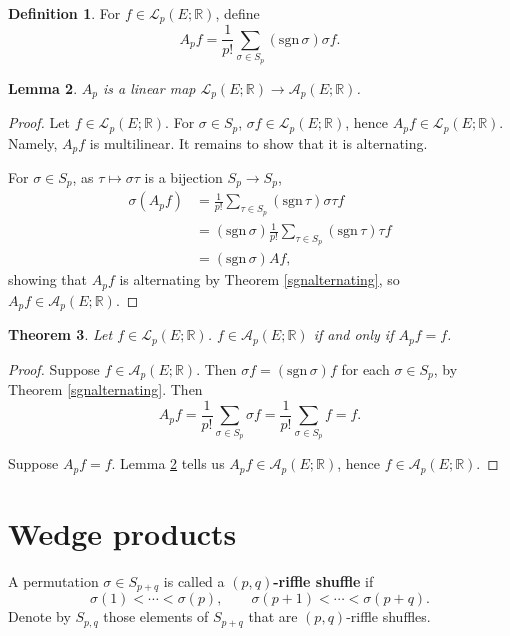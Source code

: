 \documentclass{amsart}
\newcommand{\sgn}{\mathrm{sgn}\,}
\newtheorem{theorem}{Theorem}
\newtheorem{lemma}[theorem]{Lemma}
\theoremstyle{definition}
\newtheorem{definition}[theorem]{Definition}
\begin{document}
\begin{definition}
For $f \in \mathscr{L}_p(E;\mathbb{R})$, define
\[
A_p f = \frac{1}{p!} \sum_{\sigma \in S_p} (\sgn \sigma) \sigma f.
\]
\end{definition}

\begin{lemma}
$A_p$ is a linear map $\mathscr{L}_p(E;\mathbb{R}) \to \mathscr{A}_p(E;\mathbb{R})$.
\label{Aplemma}
\end{lemma}
\begin{proof}
Let $f \in \mathscr{L}_p(E;\mathbb{R})$.  For $\sigma \in S_p$, $\sigma f \in \mathscr{L}_p(E;\mathbb{R})$, hence
$A_p f \in \mathscr{L}_p(E;\mathbb{R})$. Namely, $A_pf$ is multilinear. It remains to show that it is alternating.


For $\sigma \in S_p$, as $\tau \mapsto \sigma \tau$ is a bijection $S_p \to S_p$,
\begin{align*}
\sigma (A_pf) &=  \frac{1}{p!}\sum_{\tau \in S_p} (\sgn \tau) \sigma \tau f\\
&=(\sgn \sigma)  \frac{1}{p!} \sum_{\tau \in S_p} (\sgn \tau) \tau f\\
&=(\sgn \sigma) Af,
\end{align*}
showing that $A_pf$ is alternating by Theorem \ref{sgnalternating}, so $A_pf \in \mathscr{A}_p(E;\mathbb{R})$. 
\end{proof}


\begin{theorem}
Let $f \in \mathscr{L}_p(E;\mathbb{R})$. $f \in \mathscr{A}_p(E;\mathbb{R})$ if and only if $A_pf=f$.
\label{Aproj}
\end{theorem}
\begin{proof}
Suppose $f \in  \mathscr{A}_p(E;\mathbb{R})$. Then $\sigma f  = (\sgn \sigma) f$ for each $\sigma \in S_p$, by Theorem \ref{sgnalternating}.
Then
\[
A_p f = \frac{1}{p!} \sum_{\sigma \in S_p} \sigma f = \frac{1}{p!} \sum_{\sigma \in S_p} f = f.
\]

Suppose $A_pf =f$. Lemma \ref{Aplemma} tells us $A_pf \in \mathscr{A}_p(E;\mathbb{R})$, hence $f \in \mathscr{A}_p(E;\mathbb{R})$.
\end{proof}



\section{Wedge products}
A permutation $\sigma \in S_{p+q}$ is called a \textbf{$(p,q)$-riffle shuffle} if 
\[
\sigma(1)<\cdots<\sigma(p),\qquad \sigma(p+1)<\cdots<\sigma(p+q).
\]
Denote by $S_{p,q}$ those elements of $S_{p+q}$ that are $(p,q)$-riffle shuffles.
\end{document}
